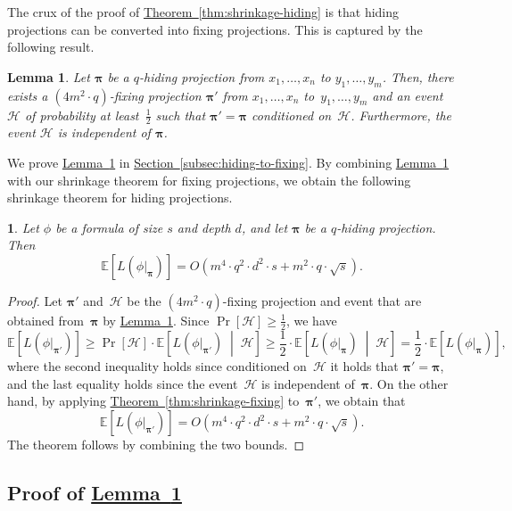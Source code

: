 \documentclass[11pt]{article}
\makeatletter
\numberwithin{equation}{section}
\newtheorem{lemma}[theorem]{Lemma}
\theoremstyle{definition}
\theoremstyle{plain}
\newcommand{\expref}[2]{\hyperref[#2]{#1~\ref{#2}}}
\theoremstyle{definition}\newtheorem{notation}[theorem]{Notation}\theoremstyle{plain}
\newcommand{\E}{\mathbb{E}}
\newcommand{\p}{\boldsymbol{\pi}}
\newcommand{\cH}{\mathcal{H}}
\theoremstyle{definition}
\theoremstyle{plain}
\newtheorem*{restated@theorem}{\rep@title}
\newenvironment{restated}[1]{%
	 \def\rep@title{#1}%
	 \begin{restated@theorem}}%
	{\end{restated@theorem}}
\makeatother
\begin{document}
The crux of the proof of \expref{Theorem}{thm:shrinkage-hiding} is that hiding projections
can be converted into fixing projections. This is captured by the
following result. 
\begin{lemma}
\label{lemma:hiding-to-fixing}Let $\p$ be a $q$-hiding projection from
$x_{1},\ldots,x_{n}$ to $y_{1},\ldots,y_{m}$. Then, there exists
a $(4m^{2}\cdot q)$-fixing projection $\p'$ from $x_{1},\ldots,x_{n}$
to~$y_{1},\ldots,y_{m}$ and an event~$\cH$ of probability at least~$\frac{1}{2}$
such that $\p'=\p$ conditioned on~$\cH$. Furthermore, the event
$\cH$ is independent of $\p$.
\end{lemma}

We prove \expref{Lemma}{lemma:hiding-to-fixing} in \expref{Section}{subsec:hiding-to-fixing}.
By combining \expref{Lemma}{lemma:hiding-to-fixing} with our shrinkage theorem for
fixing projections, we obtain the following shrinkage theorem for
hiding projections. 
\begin{restated}{\expref{Theorem}{thm:shrinkage-hiding}}
Let $\phi$ be a formula of size $s$ and depth $d$, and let $\p$
be a $q$-hiding projection. Then 
\[
\E\left[L(\phi|_{\p})\right]=O\!\left(m^{4}\cdot q^{2}\cdot d^{2}\cdot s+m^{2}\cdot q\cdot\sqrt{s}\right).
\]
\end{restated}

\begin{proof}
Let $\p'$ and~$\cH$ be the $(4m^{2}\cdot q)$-fixing projection
and event that are obtained from~$\p$ by \expref{Lemma}{lemma:hiding-to-fixing}.
Since $\Pr\left[\cH\right]\geq\frac{1}{2}$, we have 
\[
\E\left[L(\phi|_{\p'})\right]\geq\Pr\!\left[\cH\right]\cdot\E\left[L(\phi|_{\p'})\;\middle|\;\cH\right]\geq\frac{1}{2}\cdot\E\left[L(\phi|_{\p})\;\middle|\;\cH\right]=\frac{1}{2}\cdot\E\left[L(\phi|_{\p})\right],
\]
where the second inequality holds since conditioned on~$\cH$ it
holds that $\p'=\p$, and the last equality holds since the event~$\cH$
is independent of~$\p$. On the other hand, by applying 
\expref{Theorem}{thm:shrinkage-fixing}
to~$\p'$, we obtain that 
\[
\E\left[L(\phi|_{\p'})\right]=O(m^{4}\cdot q^{2}\cdot d^{2}\cdot s+m^{2}\cdot q\cdot\sqrt{s}).
\]
The theorem follows by combining the two bounds. 
\end{proof}

\subsection{\label{subsec:hiding-to-fixing}Proof of \expref{Lemma}{lemma:hiding-to-fixing}}
\end{document}
